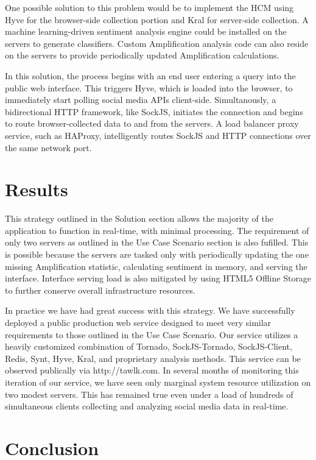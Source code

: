 \documentclass[letterpaper]{article}
\begin{document}
One possible solution to this problem would be to implement the HCM using Hyve for the browser-side collection portion and Kral for server-side collection. A machine learning-driven sentiment analysis engine could be installed on the servers to generate classifiers. Custom Amplification analysis code can also reside on the servers to provide periodically updated Amplification calculations.

In this solution, the process begins with an end user entering a query into the public web interface. This triggers Hyve, which is loaded into the browser, to immediately start polling social media APIs client-side. Simultanously, a bidirectional HTTP framework, like SockJS, initiates the connection and begins to route browser-collected data to and from the servers. A load balancer proxy service, such as HAProxy, intelligently routes SockJS and HTTP connections over the same network port.

\section{Results}

This strategy outlined in the Solution section allows the majority of the application to function in real-time, with minimal processing. The requirement of only two servers as outlined in the Use Case Scenario section is also fufilled. This is possible because the servers are tasked only with periodically updating the one missing Amplification statistic, calculating sentiment in memory, and serving the interface. Interface serving load is also mitigated by using HTML5 Offline Storage to further conserve overall infrastructure resources.

In practice we have had great success with this strategy. We have successfully deployed a public production web service designed to meet very similar requirements to those outlined in the Use Case Scenario. Our service utilizes a heavily customized combination of Tornado, SockJS-Tornado, SockJS-Client, Redis, Synt, Hyve, Kral, and proprietary analysis methods. This service can be observed publically via http://tawlk.com. In several months of monitoring this iteration of our service, we have seen only marginal system resource utilization on two modest servers. This has remained true even under a load of hundreds of simultaneous clients collecting and analyzing social media data in real-time.

\section{Conclusion}
\end{document}
